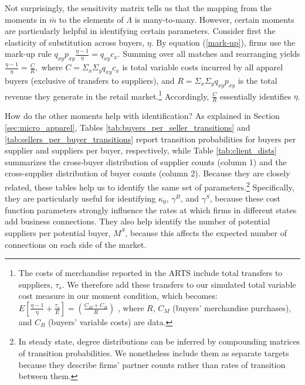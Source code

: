 \documentclass[12pt]{article} \usepackage{amsmath,amssymb,amsthm,geometry,graphicx,setspace,algorithm,algpseudocode,float}
\begin{document}
\par
Not surprisingly, the \citet{Andrews_et_al_2017} sensitivity matrix tells us that the mapping from the moments in $\bar{m}$ to the elements of $\Lambda$ is many-to-many. However, certain moments are particularly helpful in identifying certain parameters. Consider first the elasticity of substitution across buyers,  $\eta$. By equation (\ref{mark-up}), firms use the mark-up rule $  q_{xy} p_{xy} \frac{\eta -1}{\eta } = q_{xy} c_{x} $. Summing over all matches and rearranging yields $ \frac{\eta -1}{\eta } =  \frac{C}{R},$ where $C = \Sigma_{x}\Sigma_{y} q_{xy}c_{x}$ is total variable costs incurred by all apparel buyers (exclusive of transfers to suppliers), and $R = \Sigma_{x} \Sigma_{y} q_{xy}p_{xy}$ is the total revenue they generate in the retail market.\footnote{The costs of merchandise reported in the ARTS include total transfers to suppliers, $\tau_s$. We therefore add these transfers to our simulated total variable cost measure in our moment condition, which becomes:  
$E\left[ \frac{\eta -1}{\eta }+\frac{\tau_{s}}{E}\right] = \left(%
\frac{C_{M}+C_{B}}{R}\right)$ , where $R$, $C_{M}$ (buyers' merchandise purchases), and $C_{B}$ (buyers' variable costs) are data.\medskip}  Accordingly, $\frac{C}{R}$ essentially identifies $\eta$.
\par
How do the other moments help with identification? As explained in Section \ref{sec:micro_apparel}, Tables \ref{tab:buyers_per_seller_transitions} and \ref{tab:sellers_per_buyer_transitions} report transition probabilities for buyers per supplier and suppliers per buyer, respectively, while Table \ref{tab:client_dists} summarizes the cross-buyer distribution of supplier counts (column 1) and the cross-supplier distribution of buyer counts (column 2). Because they are closely related, these tables help us to identify the same set of parameters.\footnote{In steady state, degree distributions can be inferred by compounding matrices of transition probabilities. We nonetheless include them as separate targets because they describe firms' partner counts rather than rates of transition between them.\medskip} Specifically, they are particularly useful for identifying $\kappa_0$, $\gamma^B$, and $\gamma^S$, because these cost function parameters strongly influence the rates at which firms in different states add business connections. They also help identify the number of potential suppliers per potential buyer, $M^S$, because this affects the expected number of connections on each side of the market.
\par
\end{document}
